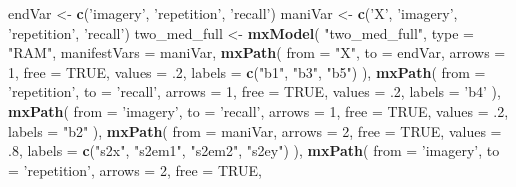 \documentclass[11pt,]{article}
\newenvironment{Shaded}{\begin{snugshade}}{\end{snugshade}}
\newcommand{\DataTypeTok}[1]{\textcolor[rgb]{0.13,0.29,0.53}{#1}}
\newcommand{\DecValTok}[1]{\textcolor[rgb]{0.00,0.00,0.81}{#1}}
\newcommand{\FloatTok}[1]{\textcolor[rgb]{0.00,0.00,0.81}{#1}}
\newcommand{\KeywordTok}[1]{\textcolor[rgb]{0.13,0.29,0.53}{\textbf{#1}}}
\newcommand{\NormalTok}[1]{#1}
\newcommand{\OtherTok}[1]{\textcolor[rgb]{0.56,0.35,0.01}{#1}}
\newcommand{\StringTok}[1]{\textcolor[rgb]{0.31,0.60,0.02}{#1}}
\begin{document}
\begin{Shaded}
\begin{Highlighting}[]
\NormalTok{endVar <-}\StringTok{ }\KeywordTok{c}\NormalTok{(}\StringTok{'imagery'}\NormalTok{, }\StringTok{'repetition'}\NormalTok{, }\StringTok{'recall'}\NormalTok{)}
\NormalTok{maniVar <-}\StringTok{ }\KeywordTok{c}\NormalTok{(}\StringTok{'X'}\NormalTok{, }\StringTok{'imagery'}\NormalTok{, }\StringTok{'repetition'}\NormalTok{, }\StringTok{'recall'}\NormalTok{)}
\NormalTok{two_med_full <-}\StringTok{ }\KeywordTok{mxModel}\NormalTok{(}
  \StringTok{"two_med_full"}\NormalTok{,}
  \DataTypeTok{type =} \StringTok{"RAM"}\NormalTok{,}
  \DataTypeTok{manifestVars =}\NormalTok{ maniVar,}
  \KeywordTok{mxPath}\NormalTok{(}
    \DataTypeTok{from =} \StringTok{"X"}\NormalTok{,}
    \DataTypeTok{to =}\NormalTok{ endVar,}
    \DataTypeTok{arrows =} \DecValTok{1}\NormalTok{,}
    \DataTypeTok{free =} \OtherTok{TRUE}\NormalTok{,}
    \DataTypeTok{values =} \FloatTok{.2}\NormalTok{,}
    \DataTypeTok{labels =} \KeywordTok{c}\NormalTok{(}\StringTok{"b1"}\NormalTok{, }\StringTok{"b3"}\NormalTok{, }\StringTok{"b5"}\NormalTok{)}
\NormalTok{  ),}
  \KeywordTok{mxPath}\NormalTok{(}
    \DataTypeTok{from =} \StringTok{'repetition'}\NormalTok{,}
    \DataTypeTok{to =} \StringTok{'recall'}\NormalTok{,}
    \DataTypeTok{arrows =} \DecValTok{1}\NormalTok{,}
    \DataTypeTok{free =} \OtherTok{TRUE}\NormalTok{,}
    \DataTypeTok{values =} \FloatTok{.2}\NormalTok{,}
    \DataTypeTok{labels =} \StringTok{'b4'}
\NormalTok{  ),}
  \KeywordTok{mxPath}\NormalTok{(}
    \DataTypeTok{from =} \StringTok{'imagery'}\NormalTok{,}
    \DataTypeTok{to =} \StringTok{'recall'}\NormalTok{,}
    \DataTypeTok{arrows =} \DecValTok{1}\NormalTok{,}
    \DataTypeTok{free =} \OtherTok{TRUE}\NormalTok{,}
    \DataTypeTok{values =} \FloatTok{.2}\NormalTok{,}
    \DataTypeTok{labels =} \StringTok{"b2"}
\NormalTok{  ),}
  \KeywordTok{mxPath}\NormalTok{(}
    \DataTypeTok{from =}\NormalTok{ maniVar,}
    \DataTypeTok{arrows =} \DecValTok{2}\NormalTok{,}
    \DataTypeTok{free =} \OtherTok{TRUE}\NormalTok{,}
    \DataTypeTok{values =} \FloatTok{.8}\NormalTok{,}
    \DataTypeTok{labels =} \KeywordTok{c}\NormalTok{(}\StringTok{"s2x"}\NormalTok{, }\StringTok{"s2em1"}\NormalTok{, }\StringTok{"s2em2"}\NormalTok{, }\StringTok{"s2ey"}\NormalTok{)}
\NormalTok{  ),}
  \KeywordTok{mxPath}\NormalTok{(}
    \DataTypeTok{from =} \StringTok{'imagery'}\NormalTok{,}
    \DataTypeTok{to =} \StringTok{'repetition'}\NormalTok{,}
    \DataTypeTok{arrows =} \DecValTok{2}\NormalTok{,}
    \DataTypeTok{free =} \OtherTok{TRUE}\NormalTok{,}

\end{Highlighting}
\end{Shaded}
\end{document}
